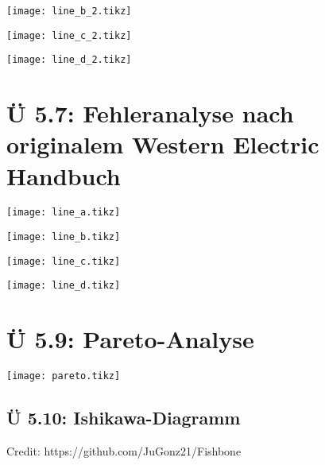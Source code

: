 \documentclass[12pt]{article}
\begin{document}
\texttt{[image: line\_b\_2.tikz]}

\texttt{[image: line\_c\_2.tikz]}

\texttt{[image: line\_d\_2.tikz]}

\section{Ü 5.7: Fehleranalyse nach originalem Western Electric Handbuch}

\texttt{[image: line\_a.tikz]}

\texttt{[image: line\_b.tikz]}

\texttt{[image: line\_c.tikz]}

\texttt{[image: line\_d.tikz]}



\section{Ü 5.9: Pareto-Analyse}

\texttt{[image: pareto.tikz]}

\begin{landscape}
	\section{Ü 5.10: Ishikawa-Diagramm}

	Credit: https://github.com/JuGonz21/Fishbone

	\begin{center}
		\resizebox{\linewidth}{!}{%
			
		}
	\end{center}
\end{landscape}
\end{document}
